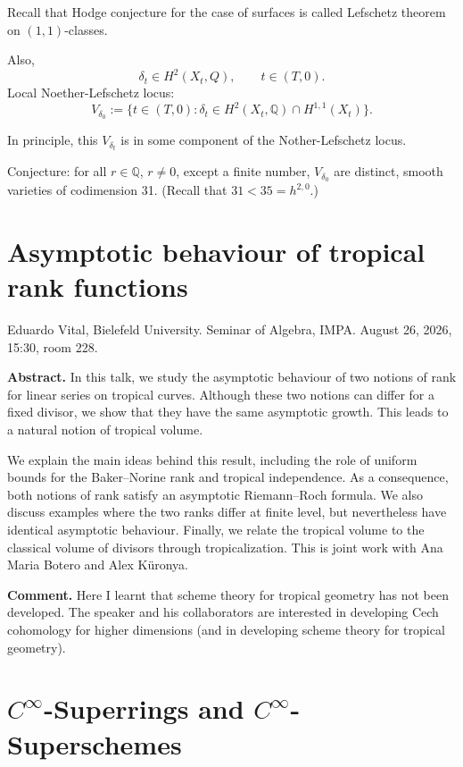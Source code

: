 Recall that Hodge conjecture for the case
of surfaces is called Lefschetz theorem
on $(1,1)$-classes.

Also,
$$
\delta_t \in H^2(X_t,Q),\qquad 
t \in (T,0).
$$
Local Noether-Lefschetz locus:
$$
V_{\delta_0}:=
\{t \in (T,0):
\delta_t \in H^2(X_t,\mathbb{Q})
\cap H^{1,1}(X_t)\}.
$$

In principle, this $V_{\delta_t}$
is in some component of the
Nother-Lefschetz locus.

\medskip\noindent
Conjecture: for all $r \in \mathbb{Q}$,
$r \neq  0$, except a finite number,
$V_{\delta_0}$ are distinct, smooth
varieties of codimension 31.
(Recall that $31 < 35 = h^{2,0}$.)


\section{Asymptotic behaviour of tropical
rank functions}
\label{section-asymptotic-tropical-rank}

\noindent
Eduardo Vital, Bielefeld University.
Seminar of Algebra, IMPA.
August 26, 2026, 15:30, room 228.

\medskip\noindent
{\bf Abstract.} In this talk, we study the
asymptotic behaviour of two notions of rank
for linear series on tropical curves.
Although these two notions can differ for a
fixed divisor, we show that they have the
same asymptotic growth. This leads to a
natural notion of tropical volume.

We explain the main ideas behind this
result, including the role of uniform bounds
for the Baker--Norine rank and tropical
independence. As a consequence, both notions
of rank satisfy an asymptotic
Riemann--Roch formula. We also discuss
examples where the two ranks differ at
finite level, but nevertheless have
identical asymptotic behaviour. Finally, we
relate the tropical volume to the classical
volume of divisors through tropicalization.
This is joint work with Ana Maria Botero and
Alex K\"uronya.

\medskip\noindent
{\bf Comment.}
Here I learnt that scheme theory
for tropical geometry has not been
developed. The speaker and his collaborators
are interested in developing
Cech cohomology for higher dimensions
(and in developing scheme theory
for tropical geometry).

\section{\texorpdfstring
{$C^\infty$}{C-infinity}-Superrings and
\texorpdfstring
{$C^\infty$}{C-infinity}-Superschemes}
\label{section-rizzo-smooth-superrings}

